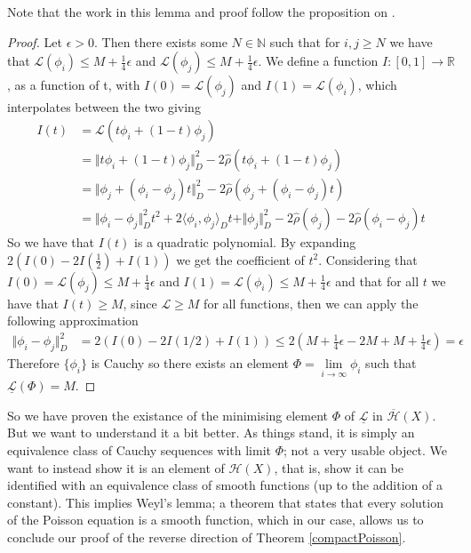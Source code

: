 \documentclass[11pt]{report}
\theoremstyle{definition}
\begin{document}
Note that the work in this lemma and proof follow the proposition on \cite[p.30]{notes}.
\begin{proof}
  Let $\epsilon > 0$. Then there exists some $N \in \mathbb{N}$ such that for $i,j \geq N$ we have that $\mathcal{L}(\phi_i) \leq M + \frac{1}{4}\epsilon$ and $\mathcal{L}(\phi_j) \leq M + \frac{1}{4}\epsilon$. We define a function $I:[0,1] \rightarrow \mathbb{R}$, as a function of t, with $I(0) = \mathcal{L}(\phi_j)$ and $I(1) = \mathcal{L}(\phi_i)$, which interpolates between the two giving
  \begin{align*}
    I(t) &= \mathcal{L}(t\phi_i + (1-t)\phi_j) \\
         &= \Vert t\phi_i + (1-t)\phi_j \Vert^2_D - 2\hat{\rho}(t\phi_i + (1-t)\phi_j) \\
         &= \Vert \phi_j + (\phi_i - \phi_j)t \Vert^2_D - 2\hat{\rho}(\phi_j + (\phi_i - \phi_j)t) \\
         &= \Vert \phi_i - \phi_j \Vert^2_Dt^2 + 2\langle \phi_i, \phi_j\rangle_Dt + \Vert \phi_j \Vert^2_D - 2\hat{\rho}(\phi_j) - 2\hat{\rho}(\phi_i - \phi_j)t
  \end{align*}
  So we have that $I(t)$ is a quadratic polynomial. By expanding $2(I(0) - 2I(\frac{1}{2})+I(1))$ we get the coefficient of $t^2$. Considering that $I(0)= \mathcal{L}(\phi_j) \leq  M + \frac{1}{4}\epsilon$ and $I(1) = \mathcal{L}(\phi_i) \leq  M + \frac{1}{4}\epsilon$ and that for all $t$ we have that $I(t) \geq M$, since $\mathcal{L} \geq M$ for all functions, then we can apply the following approximation
  \begin{align*}
    \Vert \phi_i - \phi_j \Vert^2_D &= 2(I(0) - 2I(1/2)+I(1)) \leq 2(M + \frac{1}{4}\epsilon -2M + M + \frac{1}{4}\epsilon) = \epsilon
  \end{align*}
  Therefore $\{\phi_i\}$ is Cauchy so there exists an element $\Phi = \lim\limits_{i \rightarrow \infty}\phi_i$ such that $\underline{\mathcal{L}}(\Phi) = M$.
\end{proof}
So we have proven the existance of the minimising element $\Phi$ of $\underline{\mathcal{L}}$ in $\overline{\mathcal{H}}(X)$. But we want to understand it a bit better. As things stand, it is simply an equivalence class of Cauchy sequences with limit $\Phi$; not a very usable object. We want to instead show it is an element of $\mathcal{H}(X)$, that is, show it can be identified with an equivalence class of smooth functions (up to the addition of a constant). This implies Weyl's lemma; a theorem that states that every solution of the Poisson equation is a smooth function, which in our case, allows us to conclude our proof of the reverse direction of Theorem \ref{compactPoisson}.
\end{document}
